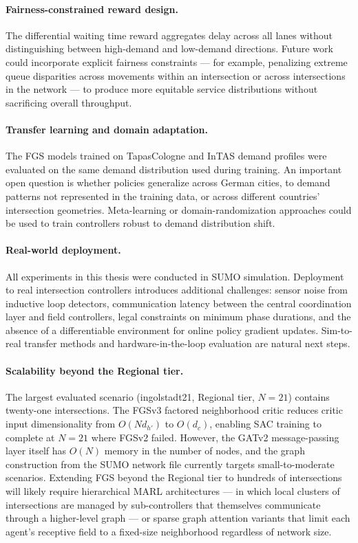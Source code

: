 \paragraph{Fairness-constrained reward design.}
The differential waiting time reward aggregates delay across all lanes without distinguishing between high-demand and low-demand directions. Future work could incorporate explicit fairness constraints — for example, penalizing extreme queue disparities across movements within an intersection or across intersections in the network — to produce more equitable service distributions without sacrificing overall throughput.

\paragraph{Transfer learning and domain adaptation.}
The FGS models trained on TapasCologne and InTAS demand profiles were evaluated on the same demand distribution used during training. An important open question is whether policies generalize across German cities, to demand patterns not represented in the training data, or across different countries' intersection geometries. Meta-learning or domain-randomization approaches could be used to train controllers robust to demand distribution shift.

\paragraph{Real-world deployment.}
All experiments in this thesis were conducted in SUMO simulation. Deployment to real intersection controllers introduces additional challenges: sensor noise from inductive loop detectors, communication latency between the central coordination layer and field controllers, legal constraints on minimum phase durations, and the absence of a differentiable environment for online policy gradient updates. Sim-to-real transfer methods and hardware-in-the-loop evaluation are natural next steps.

\paragraph{Scalability beyond the Regional tier.}
The largest evaluated scenario (ingolstadt21, Regional tier, $N=21$) contains twenty-one intersections. The FGSv3 factored neighborhood critic reduces critic input dimensionality from $O(Nd_{h'})$ to $O(d_c)$, enabling SAC training to complete at $N=21$ where FGSv2 failed. However, the GATv2 message-passing layer itself has $O(N)$ memory in the number of nodes, and the graph construction from the SUMO network file currently targets small-to-moderate scenarios. Extending FGS beyond the Regional tier to hundreds of intersections will likely require hierarchical MARL architectures — in which local clusters of intersections are managed by sub-controllers that themselves communicate through a higher-level graph — or sparse graph attention variants that limit each agent's receptive field to a fixed-size neighborhood regardless of network size.

